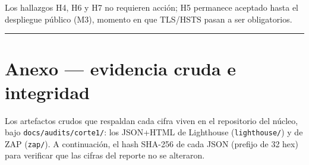 \documentclass[11pt]{article}
\newcommand{\regla}{\noindent\textcolor{linea}{\rule{\linewidth}{0.4pt}}}
\begin{document}
\noindent Los hallazgos H4, H6 y H7 no requieren acción; H5 permanece aceptado
hasta el despliegue público (M3), momento en que TLS/HSTS pasan a ser obligatorios.

\regla

\section{Anexo — evidencia cruda e integridad}
Los artefactos crudos que respaldan cada cifra viven en el repositorio del núcleo,
bajo \texttt{docs/audits/corte1/}: los JSON+HTML de Lighthouse
(\texttt{lighthouse/}) y de ZAP (\texttt{zap/}). A continuación, el hash SHA-256
de cada JSON (prefijo de 32 hex) para verificar que las cifras del reporte no se
alteraron.
\end{document}
